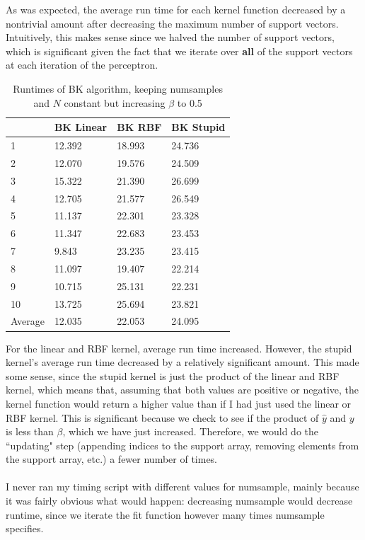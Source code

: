 \documentclass[submit]{harvardml}
\begin{document}
\noindent As was expected, the average run time for each kernel function decreased by a nontrivial amount after decreasing the maximum number of support vectors. Intuitively, this makes sense since we halved the number of support vectors, which is significant given the fact that we iterate over \textbf{all} of the support vectors at each iteration of the perceptron. 
\begin{table}[hbt]
\centering
\caption{Runtimes of BK algorithm, keeping numsamples and $N$ constant but increasing $\beta$ to 0.5}
\label{my-label}
\begin{tabular}{l|lll}
        & BK Linear & BK RBF & BK Stupid \\ \hline
1       & 12.392    & 18.993 & 24.736    \\
2       & 12.070    & 19.576 & 24.509    \\
3       & 15.322    & 21.390 & 26.699    \\
4       & 12.705    & 21.577 & 26.549    \\
5       & 11.137    & 22.301 & 23.328    \\
6       & 11.347    & 22.683 & 23.453    \\
7       & 9.843     & 23.235 & 23.415    \\
8       & 11.097    & 19.407 & 22.214    \\
9       & 10.715    & 25.131 & 22.231    \\
10      & 13.725    & 25.694 & 23.821    \\ \hline
Average & 12.035    & 22.053 & 24.095   
\end{tabular}
\end{table}
\noindent For the linear and RBF kernel, average run time increased. However, the stupid kernel's average run time decreased by a relatively significant amount. This made some sense, since the stupid kernel is just the product of the linear and RBF kernel, which means that, assuming that both values are positive or negative, the kernel function would return a higher value than if I had just used the linear or RBF kernel. This is significant because we check to see if the product of $\hat{y}$ and $y$ is less than $\beta$, which we have just increased. Therefore, we would do the ``updating" step (appending indices to the support array, removing elements from the support array, etc.) a fewer number of times. \\ \\ 
I never ran my timing script with different values for numsample, mainly because it was fairly obvious what would happen: decreasing numsample would decrease runtime, since we iterate the fit function however many times numsample specifies.\\ \\
\end{document}
